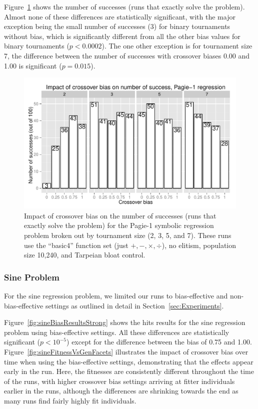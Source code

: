 \documentclass{sig-alternate}
\begin{document}
%
%
%
%

Figure~\ref{fig:Pagie1StrongSuccesses} shows the number of successes (runs that exactly solve the problem). Almost none
of these differences are statistically significant, with the major exception being the small number of successes (3)
for binary tournaments without bias, which is significantly different from all the other bias values for binary
tournaments ($p<0.0002$). The one other exception is for tournament size 7, the difference between the number of
successes with crossover biases 0.00 and 1.00 is significant ($p=0.015$).

\begin{figure}
\centering
\includegraphics[width=0.45 \textwidth]{Plots/Pagie_1_Strong_Successes_vs_Bias.pdf}
\caption{Impact of crossover bias on the number of successes (runs that exactly solve the problem) for the Pagie-1
symbolic regression problem broken out by tournament size (2, 3, 5, and 7). These runs use the ``basic4'' function set
(just $+, -, \times, \div$), no elitism, population size 10,240, and Tarpeian bloat control.}
\label{fig:Pagie1StrongSuccesses}
\end{figure}

\subsubsection{Sine Problem}
\label{sec:sineRegression}

For the sine regression problem, we limited our runs to bias-effective and non-bias-effective settings as outlined in
detail in Section~\ref{sec:Experiments}.

Figure~\ref{fig:sineBiasResultsStrong} shows the hits results for the sine regression problem using bias-effective
settings. All these differences are statistically significant ($p < 10^{-5}$) except for the difference between the
bias of 0.75 and 1.00. Figure~\ref{fig:sineFitnessVsGenFacets} illustrates the impact of crossover bias over time
when using the bias-effective settings, demonstrating that the effects appear early in the run. Here, the fitnesses are
consistently different throughout the time of the runs, with higher crossover bias settings arriving at fitter
individuals earlier in the runs, although the differences are shrinking towards the end as many runs find fairly highly
fit individuals.
\end{document}
